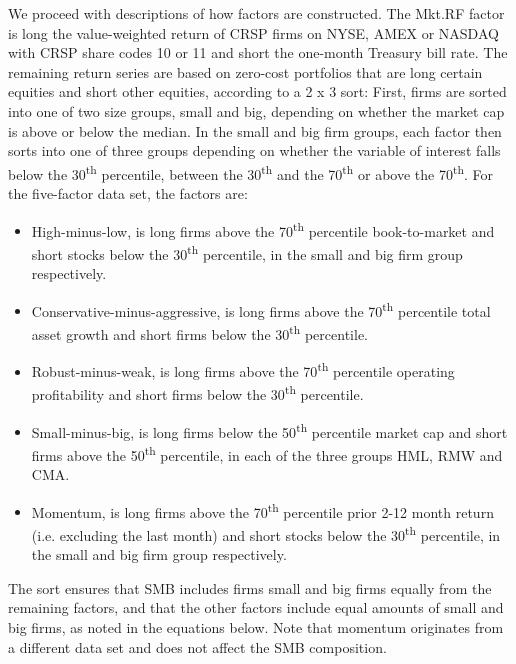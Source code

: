 We proceed with descriptions of how factors are constructed. The Mkt.RF factor is long the value-weighted return of CRSP firms on NYSE, AMEX or NASDAQ with CRSP share codes 10 or 11 and short the one-month Treasury bill rate. The remaining return series are based on zero-cost portfolios that are long certain equities and short other equities, according to a 2 x 3 sort: First, firms are sorted into one of two size groups, small and big, depending on whether the market cap is above or below the median. In the small and big firm groups, each factor then sorts into one of three groups depending on whether the variable of interest falls below the 30\textsuperscript{th} percentile, between the 30\textsuperscript{th} and the 70\textsuperscript{th} or above the 70\textsuperscript{th}. For the five-factor data set, the factors are:
\begin{itemize}
  \item High-minus-low, is long firms above the 70\textsuperscript{th} percentile book-to-market and short stocks below the 30\textsuperscript{th} percentile, in the small and big firm group respectively.
  \item Conservative-minus-aggressive, is long firms above the 70\textsuperscript{th} percentile total asset growth and short firms below the 30\textsuperscript{th} percentile. 
  \item Robust-minus-weak, is long firms above the 70\textsuperscript{th} percentile operating profitability and short firms below the 30\textsuperscript{th} percentile. 
  \item Small-minus-big, is long firms below the 50\textsuperscript{th} percentile market cap and short firms above the 50\textsuperscript{th} percentile, in each of the three groups HML, RMW and CMA.
  \item Momentum, is long firms above the 70\textsuperscript{th} percentile prior 2-12 month return (i.e. excluding the last month) and short stocks below the 30\textsuperscript{th} percentile, in the small and big firm group respectively.
\end{itemize}
The sort ensures that SMB includes firms small and big firms equally from the remaining factors, and that the other factors include equal amounts of small and big firms, as noted in the equations below. Note that momentum originates from a different data set and does not affect the SMB composition.
